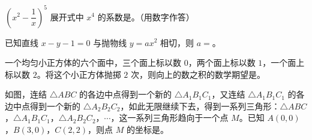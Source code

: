 \begin{question}
$\left(x^2-\dfrac{1}{x}\right)^5$ 展开式中 $x^4$ 的系数是\gkblank{}。（用数字作答）

\end{question}
\begin{question}
已知直线 $x-y-1=0$ 与抛物线 $y=ax^2$ 相切，则 $a=$\gkblank{}。

\end{question}
\begin{question}
一个均匀小正方体的六个面中，三个面上标以数 $0$，两个面上标以数 $1$，一个面上标以数 $2$。将这个小正方体抛掷 $2$ 次，则向上的数之积的数学期望是\gkblank{}。

\Needspace{0.4\textheight}
\end{question}
\begin{question}
如图，连结 $\triangle ABC$ 的各边中点得到一个新的 $\triangle A_1B_1C_1$，又连结 $\triangle A_1B_1C_1$ 的各边中点得到一个新的 $\triangle A_2B_2C_2$，如此无限继续下去，得到一系列三角形：$\triangle ABC$，$\triangle A_1B_1C_1$，$\triangle A_2B_2C_2$，$\cdots$，这一系列三角形趋向于一个点 $M$。已知 $A(0,0)$，$B(3,0)$，$C(2,2)$，则点 $M$ 的坐标是\gkblank{}。
\nopagebreak[4]
\begin{center}\end{center}
\nopagebreak[4]
\end{question}

